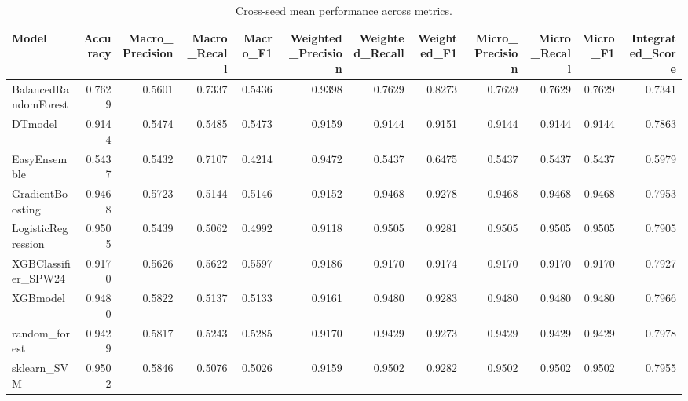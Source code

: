 \begin{table}[t]
\centering
\begin{tabular}{lrrrrrrrrrrr}
\toprule
Model & Accuracy & Macro_Precision & Macro_Recall & Macro_F1 & Weighted_Precision & Weighted_Recall & Weighted_F1 & Micro_Precision & Micro_Recall & Micro_F1 & Integrated_Score \\
\midrule
BalancedRandomForest & 0.7629 & 0.5601 & 0.7337 & 0.5436 & 0.9398 & 0.7629 & 0.8273 & 0.7629 & 0.7629 & 0.7629 & 0.7341 \\
DTmodel & 0.9144 & 0.5474 & 0.5485 & 0.5473 & 0.9159 & 0.9144 & 0.9151 & 0.9144 & 0.9144 & 0.9144 & 0.7863 \\
EasyEnsemble & 0.5437 & 0.5432 & 0.7107 & 0.4214 & 0.9472 & 0.5437 & 0.6475 & 0.5437 & 0.5437 & 0.5437 & 0.5979 \\
GradientBoosting & 0.9468 & 0.5723 & 0.5144 & 0.5146 & 0.9152 & 0.9468 & 0.9278 & 0.9468 & 0.9468 & 0.9468 & 0.7953 \\
LogisticRegression & 0.9505 & 0.5439 & 0.5062 & 0.4992 & 0.9118 & 0.9505 & 0.9281 & 0.9505 & 0.9505 & 0.9505 & 0.7905 \\
XGBClassifier_SPW24 & 0.9170 & 0.5626 & 0.5622 & 0.5597 & 0.9186 & 0.9170 & 0.9174 & 0.9170 & 0.9170 & 0.9170 & 0.7927 \\
XGBmodel & 0.9480 & 0.5822 & 0.5137 & 0.5133 & 0.9161 & 0.9480 & 0.9283 & 0.9480 & 0.9480 & 0.9480 & 0.7966 \\
random_forest & 0.9429 & 0.5817 & 0.5243 & 0.5285 & 0.9170 & 0.9429 & 0.9273 & 0.9429 & 0.9429 & 0.9429 & 0.7978 \\
sklearn_SVM & 0.9502 & 0.5846 & 0.5076 & 0.5026 & 0.9159 & 0.9502 & 0.9282 & 0.9502 & 0.9502 & 0.9502 & 0.7955 \\
\bottomrule
\end{tabular}
\caption{Cross-seed mean performance across metrics.}
\label{tab:cross_seed_mean}
\end{table}